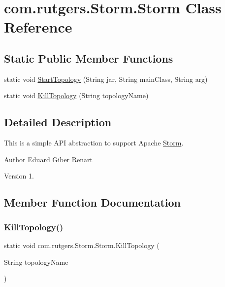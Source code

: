 \hypertarget{classcom_1_1rutgers_1_1Storm_1_1Storm}{}\section{com.\+rutgers.\+Storm.\+Storm Class Reference}
\label{classcom_1_1rutgers_1_1Storm_1_1Storm}
\subsection*{Static Public Member Functions}
\begin{DoxyCompactItemize}
\item 
static void \hyperlink{classcom_1_1rutgers_1_1Storm_1_1Storm_a3708949a7ea4e419ed9d47f19bbdb3c7}{Start\+Topology} (String jar, String main\+Class, String arg)
\item 
static void \hyperlink{classcom_1_1rutgers_1_1Storm_1_1Storm_a4d16dd15182b6e40d7380e77870892fe}{Kill\+Topology} (String topology\+Name)
\end{DoxyCompactItemize}


\subsection{Detailed Description}
This is a simple A\+PI abstraction to support Apache \hyperlink{classcom_1_1rutgers_1_1Storm_1_1Storm}{Storm}.

\begin{DoxyAuthor}{Author}
Eduard Giber Renart 
\end{DoxyAuthor}
\begin{DoxyVersion}{Version}
1. 
\end{DoxyVersion}


\subsection{Member Function Documentation}
\mbox{\label{classcom_1_1rutgers_1_1Storm_1_1Storm_a4d16dd15182b6e40d7380e77870892fe}} 
\subsubsection{\texorpdfstring{Kill\+Topology()}{KillTopology()}}
{\footnotesize\ttfamily static void com.\+rutgers.\+Storm.\+Storm.\+Kill\+Topology (\begin{DoxyParamCaption}\item[{String}]{topology\+Name }\end{DoxyParamCaption})\hspace{0.3cm}{\ttfamily [static]}}

